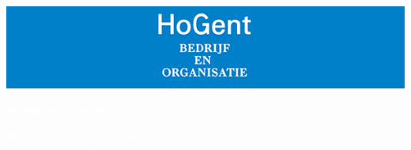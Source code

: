 \begin{titlepage}
		\pagecolor{hogentblauw}
		\afterpage{\nopagecolor}
		\centerline{\includegraphics[width=\paperwidth]{./afbeeldingen/logo_hogent.png}}
		\begin{center}			
			\vskip6.5cm
			\textcolor{white}	{
				\fontsize{50pt}{60pt}\selectfont \textbf{Handleiding Trello}
			}
			\vskip6.5cm
			\begin{flushright} {
				\textcolor{white} {
					\fontsize{14pt}{16.8pt}\selectfont \textbf{Projecten - Workshops}
				}
			}
			\end{flushright}
		\end{center}
\end{titlepage}